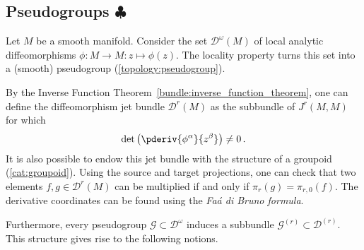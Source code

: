 
\subsection{\texorpdfstring{Pseudogroups $\clubsuit$}{Pseudogroups}}

    \begin{example}
        Let $M$ be a smooth manifold. Consider the set $\mathcal{D}^\omega(M)$ of local analytic diffeomorphisms $\phi:M\rightarrow M:z\mapsto\phi(z)$. The locality property turns this set into a (smooth) pseudogroup (\cref{topology:pseudogroup}).

        By the Inverse Function Theorem~\ref{bundle:inverse_function_theorem}, one can define the diffeomorphism jet bundle $\mathcal{D}^r(M)$ as the subbundle of $J^r(M,M)$ for which \[\det\left(\pderiv{\phi^\alpha}{z^\beta}\right)\neq0\,.\] It is also possible to endow this jet bundle with the structure of a groupoid (\cref{cat:groupoid}). Using the source and target projections, one can check that two elements $f,g\in\mathcal{D}^r(M)$ can be multiplied if and only if $\pi_r(g)=\pi_{r,0}(f)$. The derivative coordinates can be found using the \textit{Fa\'a di Bruno formula}.
    \end{example}
    Furthermore, every pseudogroup $\mathcal{G}\subset\mathcal{D}^\omega$ induces a subbundle $\mathcal{G}^{(r)}\subset\mathcal{D}^{(r)}$. This structure gives rise to the following notions.
